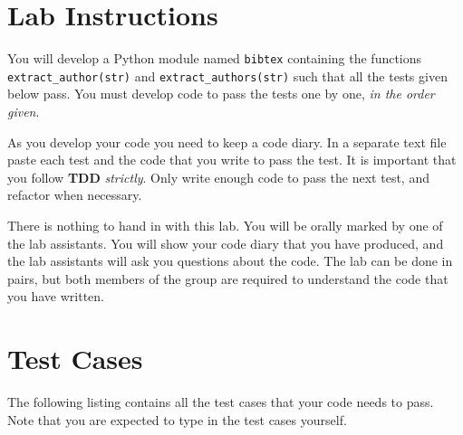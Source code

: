 \documentclass[10pt]{paper}
\begin{document}
\section*{Lab Instructions}
You will develop a Python module named \texttt{bibtex} containing the functions
\texttt{extract\_author(str)} and \texttt{extract\_authors(str)} such that all the tests given below pass. 
You must develop code to pass the tests one by one, \emph{in the order
given}. 

As you develop your code you need to keep a code diary. In a separate text
file paste each test and the code that you write to pass the test. It
is important that you follow \textbf{TDD} \emph{strictly}. Only write enough code to
pass the next test, and refactor when necessary. 

There is nothing to hand in with this lab. You will be orally marked
by one of the lab assistants. You will show your code diary that you 
have produced,
and the lab assistants will ask you questions about the code. The lab
can be done in pairs, but both members of the group are required to
understand the code that you have written.  


\section*{Test Cases}
The following listing contains all the test cases that your code needs
to pass. Note that you are expected to type in the test cases
yourself.
\end{document}
